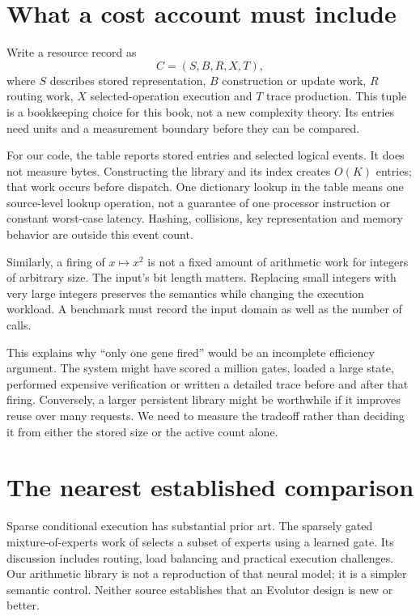 \section{What a cost account must include}
Write a resource record as
\[
 C=(S,B,R,X,T),
\]
where $S$ describes stored representation, $B$ construction or update work,
$R$ routing work, $X$ selected-operation execution and $T$ trace production.
This tuple is a bookkeeping choice for this book, not a new complexity theory.
Its entries need units and a measurement boundary before they can be compared.

For our code, the table reports stored entries and selected logical events.
It does not measure bytes. Constructing the library and its index creates
$O(K)$ entries; that work occurs before dispatch. One dictionary lookup in
the table means one source-level lookup operation, not a guarantee of one
processor instruction or constant worst-case latency. Hashing, collisions,
key representation and memory behavior are outside this event count.

Similarly, a firing of $x\mapsto x^2$ is not a fixed amount of arithmetic work
for integers of arbitrary size. The input's bit length matters. Replacing
small integers with very large integers preserves the semantics while changing
the execution workload. A benchmark must record the input domain as well as
the number of calls.

This explains why ``only one gene fired'' would be an incomplete efficiency
argument. The system might have scored a million gates, loaded a large state,
performed expensive verification or written a detailed trace before and after
that firing. Conversely, a larger persistent library might be worthwhile if
it improves reuse over many requests. We need to measure the tradeoff rather
than deciding it from either the stored size or the active count alone.

\section{The nearest established comparison}
Sparse conditional execution has substantial prior art. The sparsely gated
mixture-of-experts work of \citet{shazeer2017} selects a subset of experts using
a learned gate. Its discussion includes routing, load balancing and practical
execution challenges. Our arithmetic library is not a reproduction of that
neural model; it is a simpler semantic control. Neither source establishes
that an Evolutor design is new or better.

